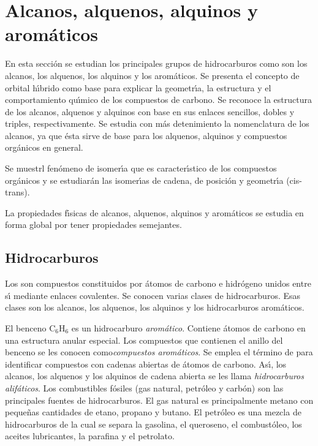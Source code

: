 \section {Alcanos, alquenos, alquinos y aro\-m\'a\-ti\-cos}
\label{aaaro}
En esta secci\'on se estudian los principales grupos de hidrocarburos como son los 
alcanos, los alquenos, los alquinos y los aro\-m\'a\-ti\-cos. Se presenta el concepto de orbital
h\'{\i}brido co\-mo base para explicar la geometr\'{\i}a, la estructura y el
comportamiento qu\'{\i}mico de los compuestos de carbono. Se reconoce la estructura de
los alcanos, alquenos y alquinos con base en sus enlaces sencillos, dobles y triples, 
respectivamente. Se estudia con m\'as detenimiento la nomenclatura de los alcanos, ya
que \'esta sirve de base para los alquenos, alquinos y compuestos org\'anicos en
general.

Se muestrl fen\'omeno de isomer\'{\i}a que es caracter\'{\i}stico de los compuestos org\'anicos y se estudiar\'an las isomer\'{\i}as de cadena, de posici\'on y
geometr\'{\i}a (cis-trans).

La propiedades f\'{\i}sicas de alcanos, alquenos, alquinos y arom\'aticos se estudia en
forma global por tener propiedades semejantes.

\subsection{Hidrocarburos}
Los \textbf{}  son compuestos constituidos por \'atomos de carbono e hi\-dr\'o\-ge\-no unidos entre s\'{\i} mediante
enlaces covalentes. Se conocen varias clases de hidrocarburos. Esas clases son los alcanos, los alquenos, los al\-qui\-nos y los hidrocarburos arom\'aticos.

El benceno C$_6$H$_6$ es un hidrocarburo \textit{arom\'atico}. Contiene
\'atomos de car\-bono en una estructura anular especial. Los compuestos que contienen el
 anillo del benceno se les conocen como\textit{compuestos
arom\'aticos}. Se emplea el t\'ermino de \textit{} para identificar compuestos con cadenas abiertas de \'atomos de
carbono. As\'{\i}, los alcanos, los alquenos y los alquinos de cadena abierta se les llama \textit{hidrocarburos alif\'aticos}. Los combustibles f\'osiles (gas natural,
petr\'oleo y carb\'on) son las principales fuentes de hidrocarburos. El gas natural es principalmente metano con pe\-que\-\~nas cantidades de etano, propano y butano. El petr\'oleo es una mezcla de hidrocarburos de la cual se separa la gasolina, el queroseno, el combust\'oleo, los aceites lubricantes, la parafina y el petrolato.

